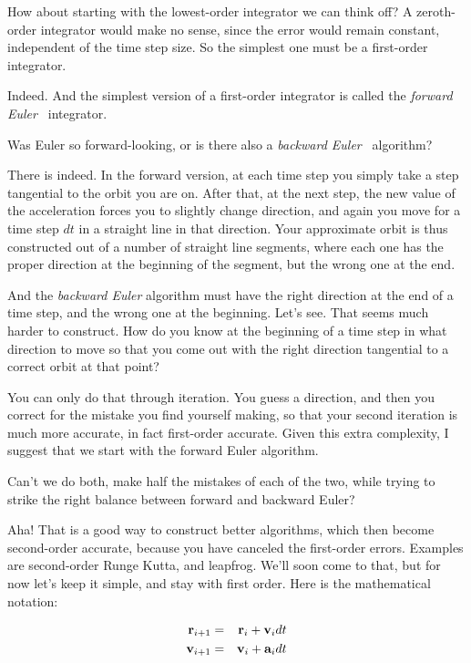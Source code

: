 \bob
How about starting with the lowest-order integrator we can think off?
A zeroth-order integrator would make no sense, since the error would
remain constant, independent of the time step size.  So the simplest
one must be a first-order integrator.

\alice
Indeed.  And the simplest version of a first-order integrator is
called the {\it forward Euler\ } integrator.

\bob
Was Euler so forward-looking, or is there also a {\it backward Euler\ }
algorithm?

\alice
There is indeed.  In the forward version, at each time step you simply
take a step tangential to the orbit you are on.  After that, at the
next step, the new value of the acceleration forces you to slightly
change direction, and again you move for a time step $dt$ in a straight
line in that direction.  Your approximate orbit is thus constructed
out of a number of straight line segments, where each one has the
proper direction at the beginning of the segment, but the wrong one at
the end.

\bob
And the {\it backward Euler} algorithm must have the right direction
at the end of a time step, and the wrong one at the beginning.  Let's
see.  That seems much harder to construct.  How do you know at the
beginning of a time step in what direction to move so that you come
out with the right direction tangential to a correct orbit at that
point?

\alice
You can only do that through iteration.  You guess a direction, and
then you correct for the mistake you find yourself making, so that
your second iteration is much more accurate, in fact first-order
accurate.  Given this extra complexity, I suggest that we start with
the forward Euler algorithm.

\carol
Can't we do both, \ie make half the mistakes of each of the two, while
trying to strike the right balance between forward and backward Euler?

\alice
Aha!  That is a good way to construct better algorithms, which then
become second-order accurate, because you have canceled the first-order
errors.  Examples are second-order Runge Kutta, and leapfrog.  We'll
soon come to that, but for now let's keep it simple, and stay with
first order.  Here is the mathematical notation:

\begin{eqnarray}
\br_{i+1} & = & \br_i + \bv_i dt \label{forward-euler-step1} \\
\bv_{i+1} & = & \bv_i + \ba_i dt \label{forward-euler-step2}
\end{eqnarray}

